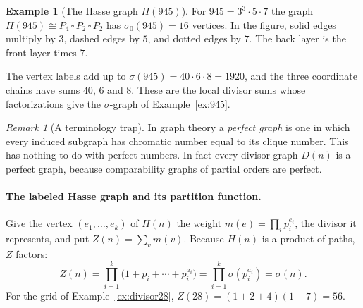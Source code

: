 \documentclass[11pt]{article}
\theoremstyle{definition}
\newtheorem{example}[theorem]{Example}
\theoremstyle{remark}
\newtheorem{remark}[theorem]{Remark}
\begin{document}
\begin{example}[The Hasse graph $H(945)$]\label{ex:H945}
For $945=3^3\cdot5\cdot7$ the graph $H(945)\cong P_4\,\square\,P_2\,\square\,P_2$
has $\sigma_0(945)=16$ vertices.  In the figure, solid edges multiply by $3$,
dashed edges by $5$, and dotted edges by $7$.  The back layer is the front
layer times $7$.
\begin{center}
\end{center}
The vertex labels add up to $\sigma(945)=40\cdot6\cdot8=1920$, and the
three coordinate chains have sums $40$, $6$ and $8$.  These are the local
divisor sums whose factorizations give the $\sigma$-graph of
Example~\ref{ex:945}.
\end{example}

\begin{remark}[A terminology trap]
In graph theory a \emph{perfect graph} is one in which every induced
subgraph has chromatic number equal to its clique number.  This has nothing
to do with perfect numbers.  In fact every divisor graph $D(n)$ is a perfect
graph, because comparability graphs of partial orders are perfect.
\end{remark}

\paragraph{The labeled Hasse graph and its partition function.}
Give the vertex $(e_1,\dots,e_k)$ of $H(n)$ the weight
$m(e)=\prod_ip_i^{e_i}$, the divisor it represents, and put
$Z(n)=\sum_v m(v)$.  Because $H(n)$ is a product of paths, $Z$ factors:
\[
Z(n)=\prod_{i=1}^k\bigl(1+p_i+\cdots+p_i^{a_i}\bigr)=\prod_{i=1}^k\sigma(p_i^{a_i})=\sigma(n).
\]
For the grid of Example~\ref{ex:divisor28}, $Z(28)=(1+2+4)(1+7)=56$.
\end{document}
